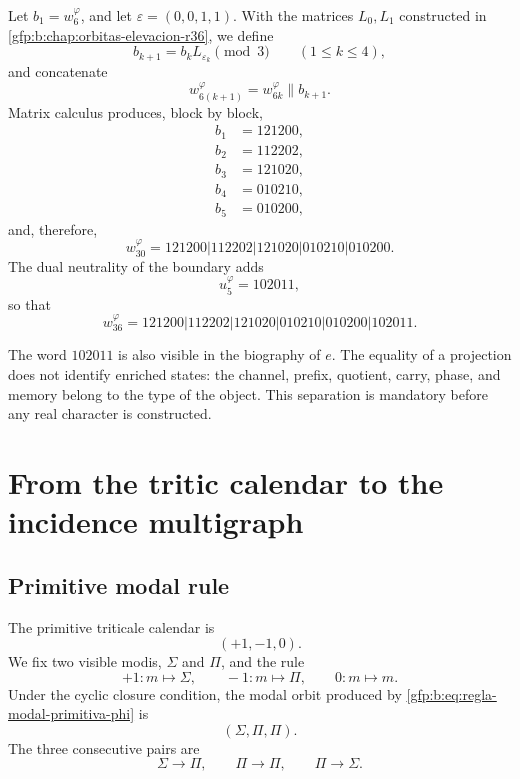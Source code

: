 Let \(b_1=w_6^{\varphi}\), and let
\(\varepsilon=(0,0,1,1)\). With the matrices \(L_0,L_1\) constructed in
\cref{gfp:b:chap:orbitas-elevacion-r36}, we define
\[
 b_{k+1}=b_kL_{\varepsilon_k}\pmod3
 \qquad(1\leq k\leq4),
\]
and concatenate
\[
 w_{6(k+1)}^{\varphi}=w_{6k}^{\varphi}\mathbin{\|}b_{k+1}.
\]
Matrix calculus produces, block by block,
\[
\begin{aligned}
 b_1&=121200,\\
 b_2&=112202,\\
 b_3&=121020,\\
 b_4&=010210,\\
 b_5&=010200,
\end{aligned}
\]
and, therefore,
\begin{equation}
 \boxed{
 w_{30}^{\varphi}
 =121200|112202|121020|010210|010200.}
 \label{gfp:b:eq:w30-phi}
\end{equation}
The dual neutrality of the boundary adds
\[
 u_5^{\varphi}=102011,
\]
so that
\begin{equation}
 \boxed{
 w_{36}^{\varphi}
 =121200|112202|121020|010210|010200|102011.}
 \label{gfp:b:eq:w36-phi}
\end{equation}

\begin{remark}
The word \(102011\) is also visible in the biography of \(e\). The
equality of a projection does not identify enriched states: the channel,
prefix, quotient, carry, phase, and memory belong to the type of the
object. This separation is mandatory before any
real character is constructed.
\end{remark}

\section{From the tritic calendar to the incidence multigraph}

\subsection{Primitive modal rule}

The primitive triticale calendar is
\[
 (+1,-1,0).
\]
We fix two visible modis, \(\Sigma\) and \(\Pi\), and the rule
\begin{equation}
 +1:m\longmapsto\Sigma,
 \qquad
 -1:m\longmapsto\Pi,
 \qquad
 0:m\longmapsto m.
 \label{gfp:b:eq:regla-modal-primitiva-phi}
\end{equation}
Under the cyclic closure condition, the modal orbit produced by
\eqref{gfp:b:eq:regla-modal-primitiva-phi} is
\[
 \boxed{(\Sigma,\Pi,\Pi).}
\]
The three consecutive pairs are
\[
 \Sigma\longrightarrow\Pi,
 \qquad
 \Pi\longrightarrow\Pi,
 \qquad
 \Pi\longrightarrow\Sigma.
\]

